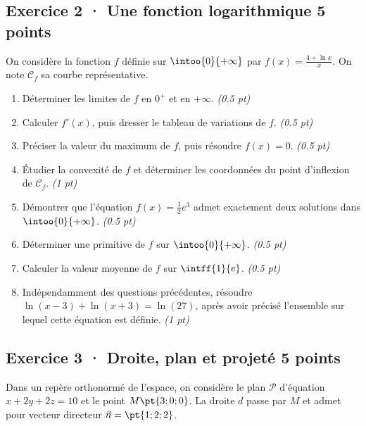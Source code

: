\subsection*{Exercice 2 · Une fonction logarithmique \hfill 5 points}On considère la fonction $f$ définie sur $\intoo{0}{+\infty}$ par $f(x)=\frac{4+\ln x}x$. On note $\mathcal C_f$ sa courbe représentative.

\begin{enumerate}

\item Déterminer les limites de $f$ en $0^+$ et en $+\infty$. \hfill\textit{(\num{0,5} pt)}

\item Calculer $f' (x)$, puis dresser le tableau de variations de $f$. \hfill\textit{(\num{0,5} pt)}

\item Préciser la valeur du maximum de $f$, puis résoudre $f(x)=0$. \hfill\textit{(\num{0,5} pt)}

\item Étudier la convexité de $f$ et déterminer les coordonnées du point d'inflexion de $\mathcal C_f$. \hfill\textit{(1 pt)}

\item Démontrer que l'équation $f(x)=\frac12 e^{3}$ admet exactement deux solutions dans $\intoo{0}{+\infty}$. \hfill\textit{(\num{0,5} pt)}

\item Déterminer une primitive de $f$ sur $\intoo{0}{+\infty}$. \hfill\textit{(\num{0,5} pt)}

\item Calculer la valeur moyenne de $f$ sur $\intff{1}{e}$. \hfill\textit{(\num{0,5} pt)}

\item Indépendamment des questions précédentes, résoudre $\ln(x-3)+\ln(x+3)=\ln(27)$, après avoir précisé l'ensemble sur lequel cette équation est définie. \hfill\textit{(1 pt)}

\end{enumerate}

\mxnewpage{}

\subsection*{Exercice 3 · Droite, plan et projeté \hfill 5 points}Dans un repère orthonormé de l'espace, on considère le plan $\mathcal P$ d'équation $x+2y+2z=10$ et le point $M\pt{3;0;0}$. La droite $d$ passe par $M$ et admet pour vecteur directeur $\vec n=\pt{1;2;2}$.

